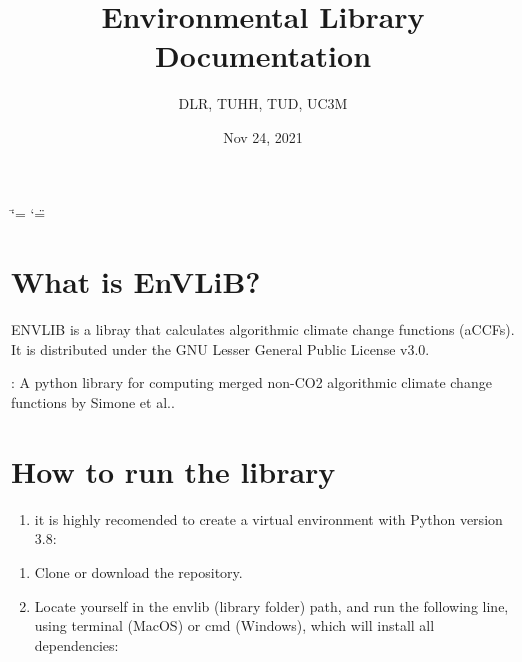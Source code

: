 \documentclass[a4paper,11pt,english]{sphinxmanual}
\title{Environmental Library Documentation}
\date{Nov 24, 2021}
\author{DLR, TUHH, TUD, UC3M}
\begin{document}
\ifdefined\shorthandoff
  \ifnum\catcode`\=\string=\active\shorthandoff{=}\fi
  \ifnum\catcode`\"=\active{}\fi
\fi

\pagestyle{empty}
\sphinxmaketitle
\pagestyle{plain}
\sphinxtableofcontents
\pagestyle{normal}
\label{\detokenize{index::doc}}



\chapter{What is EnVLiB?}
\label{\detokenize{index:what-is-envlib}}
ENVLIB is a libray that calculates algorithmic climate change functions (aCCFs).
It is distributed under the GNU Lesser General Public License v3.0.

: A python library for computing merged non-CO2 algorithmic
climate change functions by Simone et al.. 

\chapter{How to run the library}
\label{\detokenize{index:how-to-run-the-library}}\begin{enumerate}
%
\setcounter{enumi}{-1}
\item {} 
it is highly recomended to create a virtual environment with Python version 3.8:

\end{enumerate}

\begin{sphinxVerbatim}[commandchars=\\\{\}]
    
  
\end{sphinxVerbatim}
\begin{enumerate}
%
\item {} 
Clone or download the repository.

\item {} 
Locate yourself in the envlib (library folder) path, and run the following line, using terminal (MacOS) or cmd (Windows), which will install all dependencies:

\end{enumerate}

\begin{sphinxVerbatim}[commandchars=\\\{\}]
  
\end{sphinxVerbatim}
\end{document}
